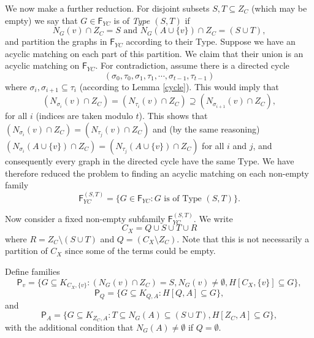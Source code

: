 \documentclass[10pt]{amsart}
\theoremstyle{definition}
\begin{document}
	We now make a further reduction. 
	For disjoint subsets $S,T\subseteq Z_C$ (which may be empty) we say that $G\in \mathsf{F}_{YC}$ is of {\em Type $(S,T)$} if 
	\[N_G(v) \cap Z_C = S \text{ and } N_G(A\cup \{v\})\cap Z_C = (S\cup T),\] 
	and partition the graphs in $\mathsf{F}_{YC}$ according to their Type. Suppose we have an acyclic matching on each part of this partition. We claim that their union is an acyclic matching on $\mathsf{F}_{YC}$. For contradiction, assume there is a directed cycle 
	\[(\sigma_0, \tau_0, \sigma_1, \tau_1, \cdots, \sigma_{t-1}, \tau_{t-1})\]
	where $\sigma_i, \sigma_{i+1}\subseteq \tau_i$ (according to Lemma \ref{cycle}). This would imply that 
	\[(N_{\sigma_i}(v)\cap Z_C) = (N_{\tau_i}(v)\cap Z_C) \supseteq (N_{\sigma_{i+1}}(v)\cap Z_C),\]
	for all $i$ (indices are taken modulo $t$). This shows that $(N_{\sigma_i}(v)\cap Z_C) = (N_{\tau_j}(v)\cap Z_C)$ and (by the same reasoning) $(N_{\sigma_i}(A\cup\{v\}) \cap Z_C) = (N_{\tau_j}(A\cup \{v\})\cap Z_C)$ for all $i$ and $j$, and consequently every graph in the directed cycle have the same Type. We have therefore reduced the problem to finding an acyclic matching on each non-empty family \[\mathsf{F}_{YC}^{(S,T)} = \{G\in \mathsf{F}_{YC} : G \text{ is of Type } (S,T)\}.\]
	
	Now consider a fixed non-empty subfamily $\mathsf{F}_{YC}^{(S,T)}$. We write 
	\[C_X = Q \cup S \cup T \cup R\]
	where $R = Z_C \setminus (S\cup T)$ and $Q = (C_X\setminus Z_C)$. 
	Note that this is not necessarily a partition of $C_X$ since some of the terms could be empty.
	
	Define families
	\[\mathsf{P}_v = \{G\subseteq K_{C_X, \{v\}} 
	: (N_G(v) \cap Z_C) = S, N_G(v)\neq\emptyset, H[C_X, \{v\}]\subseteq G\},\]
	\[\mathsf{P}_Q = \{G\subseteq K_{Q,A} 
	: H[Q, A]\subseteq G\},\]
	and 
	\[\mathsf{P}_A = \{G\subseteq K_{Z_C, A} : T\subseteq N_G(A) \subseteq (S\cup T), H[Z_C, A]\subseteq G\},\] with the additional condition that $N_G(A)\neq\emptyset$ if $Q = \emptyset$. 
	
\end{document}
